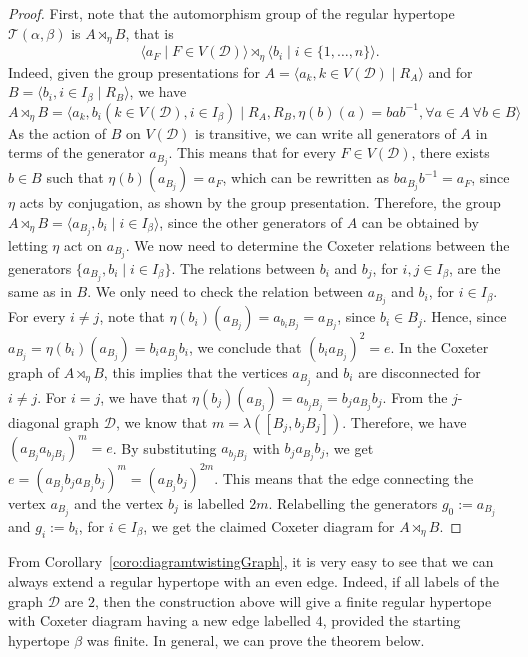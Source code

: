 \documentclass[11pt,letterpaper]{amsart}
\newcommand{\TT}{\mathcal{T}}
\begin{document}
\begin{proof}
    First, note that the automorphism group of the regular hypertope $\TT(\alpha,\beta)$ is $A\rtimes_\eta B$, that is 
    $$\langle a_F \mid F\in V(\mathcal{D}) \rangle \rtimes_\eta \langle b_i\mid i\in \{1,\ldots,n\} \rangle.$$
    Indeed, given the group presentations for $A = \langle a_k, k\in V(\mathcal{D})\mid R_A\rangle$ and for $B = \langle b_i, i\in I_\beta\mid R_B\rangle$, we have $$A\rtimes_\eta B = \langle a_k,b_i (k\in V(\mathcal{D}),i\in I_\beta)\mid R_A, R_B, \eta(b)(a) = bab^{-1}, \forall a\in A\ \forall b\in B\rangle$$
    As the action of $B$ on $V(\mathcal{D})$ is transitive, we can write all generators of $A$ in terms of the generator $a_{B_j}$.  This means that for every $F\in V(\mathcal{D})$, there exists $b\in B$ such that $\eta(b)(a_{B_j})=a_F$, which can be rewritten as $ba_{B_j}b^{-1}=a_F$, since $\eta$ acts by conjugation, as shown by the group presentation.
    Therefore, the group $A\rtimes_\eta B = \langle a_{B_j}, b_i\mid i\in I_\beta\rangle$, since the other generators of $A$ can be obtained by letting $\eta$ act on $a_{B_j}$.
    We now need to determine the Coxeter relations between the generators $\{a_{B_j},b_i\mid i\in I_\beta\}$. The relations between $b_i$ and $b_j$, for $i,j \in I_\beta$, are the same as in $B$. We only need to check the relation between $a_{B_j}$ and $b_i$, for $i\in I_\beta$.
    For every $i\neq j$, note that $\eta(b_i)(a_{B_j}) = a_{b_iB_j} = a_{B_j}$, since $b_i\in B_j$. Hence, since $a_{B_j} = \eta(b_i)(a_{B_j}) = b_ia_{B_j}b_i$, we conclude that $(b_ia_{B_j})^2 = e$. In the Coxeter graph of $A\rtimes_\eta B$, this implies that the vertices $a_{B_j}$ and $b_i$ are disconnected for $i\neq j$.
    For $i=j$, we have that $\eta(b_j)(a_{B_j}) = a_{b_jB_j}=b_ja_{B_j}b_j$. From the $j$-diagonal graph $\mathcal{D}$, we know that $m=\lambda([B_j,b_jB_j])$. Therefore, we have $(a_{B_j}a_{b_jB_j})^m=e$. By substituting $a_{b_jB_j}$ with $b_ja_{B_j}b_j$, we get $e = (a_{B_j}b_ja_{B_j}b_j)^m = (a_{B_j}b_j)^{2m}$. This means that the edge connecting the vertex $a_{B_{j}}$ and the vertex $b_j$ is labelled $2m$.
    Relabelling the generators $g_0 := a_{B_j}$ and $g_i:=b_i$, for $i\in I_\beta$, we get the claimed Coxeter diagram for $A\rtimes_\eta B$.
    
    
    
\end{proof}

From Corollary~\ref{coro:diagramtwistingGraph}, it is very easy to see that we can always extend a regular hypertope with an even edge. Indeed, if all labels of the graph $\mathcal{D}$ are $2$, then the construction above will give a finite regular hypertope with Coxeter diagram having a new edge labelled $4$, provided the starting hypertope $\beta$ was finite. In general, we can prove the theorem below.
\end{document}

